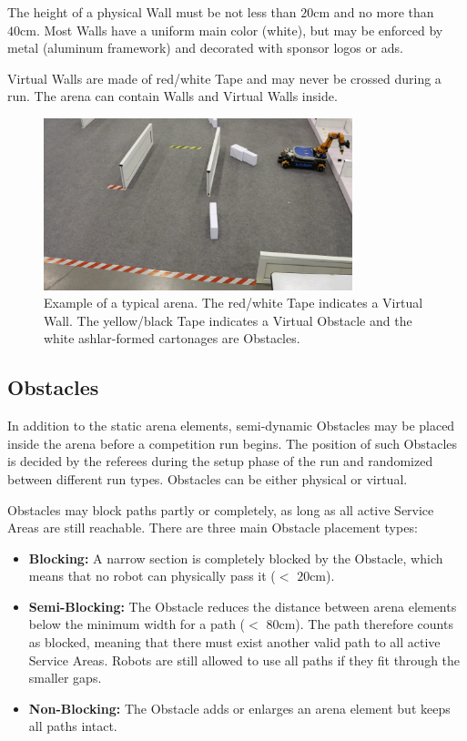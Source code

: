 The height of a physical Wall must be not less than $20\si{\centi\meter}$ and no more than $40\si{\centi\meter}$.
Most Walls have a uniform main color (white), but may be enforced by metal (aluminum framework) and decorated with sponsor logos or ads.

Virtual Walls are made of red/white Tape and may never be crossed during a run. The arena can contain Walls and Virtual Walls inside.

\begin{figure} [h!]
\centering
\includegraphics[width= 0.8\textwidth ]{./images/general_rules/barrier_tapes_in_china15.jpg}
\caption{Example of a typical arena. The red/white Tape indicates a Virtual Wall. The yellow/black Tape indicates a Virtual Obstacle and the white ashlar-formed cartonages are Obstacles.}
\label{fig:walls_and_virt_walls}
\end{figure}

\subsection{Obstacles}
\label{subsec: Obstacles}

In addition to the static arena elements, semi-dynamic Obstacles may be placed inside the arena before a competition run begins. 
The position of such Obstacles is decided by the referees during the setup phase of the run and randomized between different run types. Obstacles can be either physical or virtual.

Obstacles may block paths partly or completely, as long as all active Service Areas are still reachable.
There are three main Obstacle placement types:

\begin{itemize}
\item \textbf{Blocking:} 
A narrow section is completely blocked by the Obstacle, which means that no robot can physically pass it ($<$ $20\si{\centi\meter}$).

\item \textbf{Semi-Blocking:} 
The Obstacle reduces the distance between arena elements below the minimum width for a path ($<$ $80\si{\centi\meter}$). The path therefore counts as blocked, meaning that there must exist another valid path to all active Service Areas. Robots are still allowed to use all paths if they fit through the smaller gaps.

\item \textbf{Non-Blocking:}
The Obstacle adds or enlarges an arena element but keeps all paths intact.
\end{itemize}


